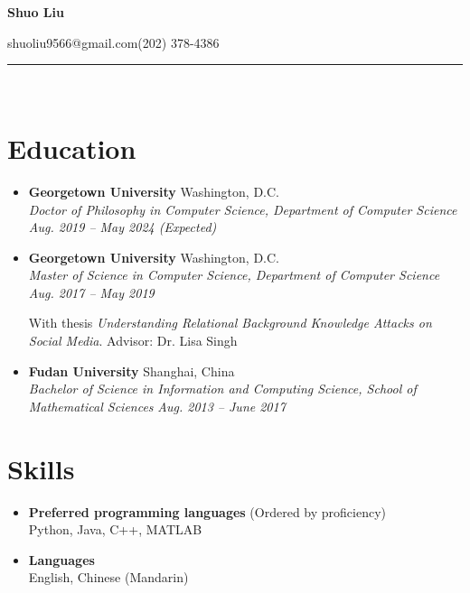 \documentclass[letterpaper,11pt]{article}
\makeatletter
\newcommand{\resumeSubheading}[4]{
  \vspace{-7pt}\item
      \textbf{#1} \hfill #2 \\
      \textit{\small#3} \hfill \textit{\small #4}
  \vspace{-4pt}
}
\newcommand{\resumeSubheadingSmall}[2]{
  \vspace{-7pt}\item
      \textbf{#1} \hfill #2 \\
}
\newcommand{\resumeSubHeadingListStart}{\begin{itemize}[leftmargin=*]}
\newcommand{\resumeSubHeadingListEnd}{\end{itemize}}
\makeatother
\begin{document}
\begin{center}
\textbf{\huge Shuo Liu}

\vspace{5pt}
shuoliu9566@gmail.com\qquad (202) 378-4386

\date{\today}

\end{center}
\vspace{-15pt}
\noindent\rule{\textwidth}{1.5pt}\\
\vspace{-5pt}
\section{Education}
  \resumeSubHeadingListStart
    \resumeSubheading
      {Georgetown University}{Washington, D.C.}
      {Doctor of Philosophy in Computer Science\emph{, Department of Computer Science}}{Aug. 2019 -- May 2024 (Expected)}
    \resumeSubheading
      {Georgetown University}{Washington, D.C.}
      {Master of Science in Computer Science\emph{, Department of Computer Science}}{Aug. 2017 -- May 2019}

      \begin{small}{With thesis \emph{Understanding Relational Background Knowledge Attacks on Social Media}. Advisor: Dr. Lisa Singh}\end{small}
    \resumeSubheading
      {Fudan University}{Shanghai, China}
      {Bachelor of Science in Information and Computing Science\emph{, School of Mathematical Sciences}}{Aug. 2013 -- June 2017}
  \resumeSubHeadingListEnd

\section{Skills}
  \resumeSubHeadingListStart
    \resumeSubheadingSmall
      {Preferred programming languages}{(Ordered by proficiency)}

      Python, Java, C++, MATLAB
    \resumeSubheadingSmall
      {Languages}{}

      English, Chinese (Mandarin)
  \resumeSubHeadingListEnd


\end{document}
